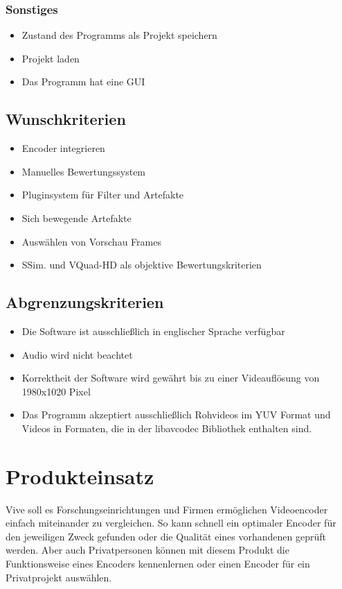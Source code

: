 \documentclass[parskip=full]{scrartcl}
\begin{document}
\subsubsection{Sonstiges}
\begin{itemize}
\item Zustand des Programms als Projekt speichern
\item Projekt laden
\item Das Programm hat eine GUI
\end{itemize}
\subsection{Wunschkriterien}
\begin{itemize}
\item Encoder integrieren
\item Manuelles Bewertungssystem
\item Pluginsystem für Filter und Artefakte
\item Sich bewegende Artefakte
\item Auswählen von Vorschau Frames
\item SSim. und VQuad-HD als objektive Bewertungskriterien
\end{itemize}
\subsection{Abgrenzungskriterien}
\begin{itemize}
\item Die Software ist ausschließlich in englischer Sprache verfügbar
\item Audio wird nicht beachtet
\item Korrektheit der Software wird gewährt bis zu einer Videauflösung von 1980x1020 Pixel
\item Das Programm akzeptiert ausschließlich Rohvideos im YUV Format und Videos in Formaten, die in der libavcodec Bibliothek enthalten sind. 
\end{itemize}
\newpage
\section{Produkteinsatz}
Vive soll es Forschungseinrichtungen und Firmen ermöglichen Videoencoder einfach
miteinander zu vergleichen. So kann schnell ein optimaler Encoder für den jeweiligen Zweck
gefunden oder die Qualität eines vorhandenen geprüft werden. Aber auch Privatpersonen können
mit diesem Produkt die Funktionsweise eines Encoders kennenlernen oder einen Encoder für ein
Privatprojekt auswählen.
\end{document}
